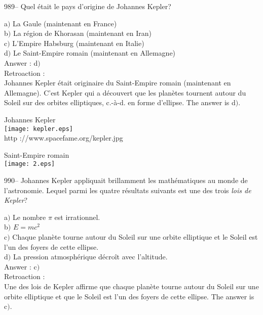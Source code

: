 ﻿\documentclass[letterpaper, 12pt]{article}
\begin{document}
989-- Quel \'etait le pays d'origine de Johannes Kepler?

a$)$ La Gaule (maintenant en France) \\
b$)$ La r\'egion de Khorasan (maintenant en Iran) \\
c$)$ L'Empire Habsburg (maintenant en Italie) \\
d$)$ Le Saint-Empire romain (maintenant en Allemagne)\\

Answer : d$)$\\

Retroaction : \\
Johannes Kepler \'etait originaire du Saint-Empire romain
(maintenant en Allemagne). C'est Kepler qui a d\'ecouvert que les
plan\`etes tournent autour du Soleil sur des orbites elliptiques,
c.-\`a-d. en forme d'ellipse.
The answer is d$)$.\\

        \begin{center}
        Johannes Kepler\\
    \texttt{[image: kepler.eps]}\\
        {\footnotesize http ://www.spacefame.org/kepler.jpg}
    \end{center}

        \begin{center}
        Saint-Empire romain\\
    \texttt{[image: 2.eps]}\\
    \end{center}

990-- Johannes Kepler appliquait brillamment les math\'ematiques au
monde de l'astronomie. Lequel parmi les quatre r\'esultats suivants
est une des trois {\sl lois de Kepler}?

a$)$ Le nombre $\pi$ est irrationnel.\\
b$)$ $E=mc^2$ \\
c$)$ Chaque plan\`ete tourne autour du Soleil sur une orbite
elliptique et le Soleil
est l'un des foyers de cette ellipse. \\
d$)$ La pression atmosph\'erique d\'ecro\^it avec l'altitude.\\

Answer : c$)$\\

Retroaction : \\
Une des lois de Kepler affirme que chaque plan\`ete tourne autour du
Soleil sur une orbite elliptique et que le Soleil
est l'un des foyers de cette ellipse. The answer is c$)$.\\
\end{document}
